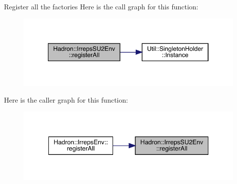 Register all the factories Here is the call graph for this function\+:\nopagebreak
\begin{figure}[H]
\begin{center}
\leavevmode
\includegraphics[width=340pt]{d4/dd8/namespaceHadron_1_1IrrepsSU2Env_a431c2f7d56a7ee761b4dda2bb49cfd70_cgraph}
\end{center}
\end{figure}
Here is the caller graph for this function\+:\nopagebreak
\begin{figure}[H]
\begin{center}
\leavevmode
\includegraphics[width=335pt]{d4/dd8/namespaceHadron_1_1IrrepsSU2Env_a431c2f7d56a7ee761b4dda2bb49cfd70_icgraph}
\end{center}
\end{figure}
